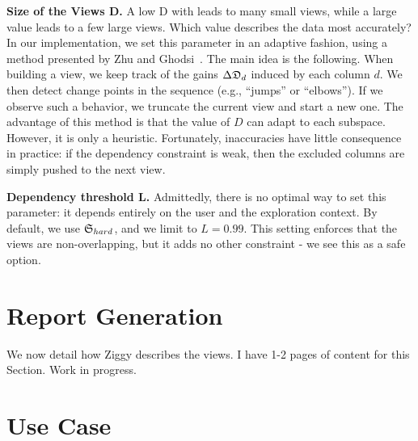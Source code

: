 \textbf{Size of the Views D.}  A low D with leads to many small views, while a
large value leads to a few large views. Which value describes the data most
accurately? In our implementation, we set this parameter in an adaptive
fashion, using a method presented by Zhu and Ghodsi~\cite{zhu2006automatic}.
The main idea is the following. When building a view, we keep track of the
gains $\Delta\mathfrak{D}_d$ induced by each column $d$.  We then detect change
points in the sequence (e.g., ``jumps'' or ``elbows'').  If we observe such a
behavior, we truncate the current view and start a new one.  The advantage of
this method is that the value of $D$ can adapt to each subspace. However, it is
only a heuristic. Fortunately, inaccuracies have little consequence in
practice: if the dependency constraint is weak, then the excluded columns are
simply pushed to the next view.

\textbf{Dependency threshold L.} Admittedly, there is no optimal way to set
this parameter: it depends entirely on the user and the exploration context. By
default, we use $\mathfrak{S}_{hard}$, and we limit to $L=0.99$. This setting
enforces that the views are non-overlapping, but it adds no other constraint -
we see this as a safe option.


\section{Report Generation}
\label{sec:reporting}
We now detail how Ziggy describes the views.
{\color{red} I have 1-2 pages of content for this Section. Work in progress.}

\section{Use Case}
\label{sec:usecase}

